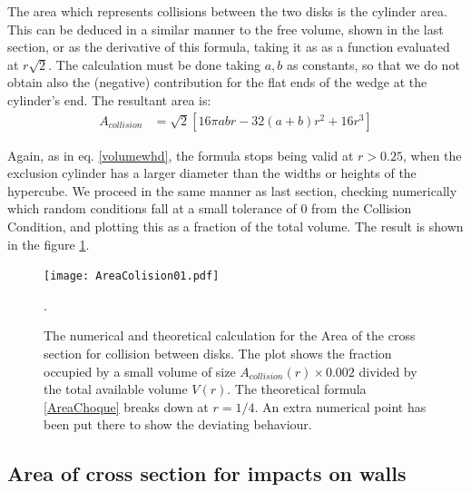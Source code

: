 \documentclass[a4paper,10pt, jcp, aps, preprint]{revtex4-1}
\begin{document}
The area which represents collisions between the two disks is the cylinder area. 
This can be deduced in a similar manner to the free volume, shown in the last
section, or as the derivative of this formula, taking it as as a function evaluated at 
$r\sqrt{2}$. The calculation must be done taking $a,b$ as constants, so that
we do not obtain also the (negative) contribution for the flat ends of
the wedge at the cylinder's end. The resultant area is:
\begin{align}\label{AreaChoque}
A_{collision} & =\sqrt{2}[  
16\pi a b r -32 (a+b)r^2 +16 r^3 ] 
\end{align}

Again, as in eq. \ref{volumewhd}, the formula stops being valid
at $r>0.25$, when the exclusion cylinder has a larger diameter than
the widths or heights of the hypercube.  
We proceed in the same manner as last section, checking numerically which
random
conditions fall at a small tolerance of $0$ from the Collision Condition, and
plotting this as a fraction of the total volume. The result is shown in the
figure \ref{AreaChoqueTeoyNum}. 

\begin{figure}
\centering
\texttt{[image: AreaColision01.pdf]}
\caption{The numerical and theoretical calculation for the Area of the cross section
for collision between disks. The plot shows the fraction occupied by a small volume
of size $A_{collision}(r)\times 0.002$ divided by the total
available volume $V(r)$. The theoretical formula 
\ref{AreaChoque} breaks down at
$r=1/4$. 
An extra numerical point has been put there to show the deviating behaviour.}
\label{AreaChoqueTeoyNum}.
\end{figure}


\subsection{Area of cross section for  impacts on walls}
\end{document}
